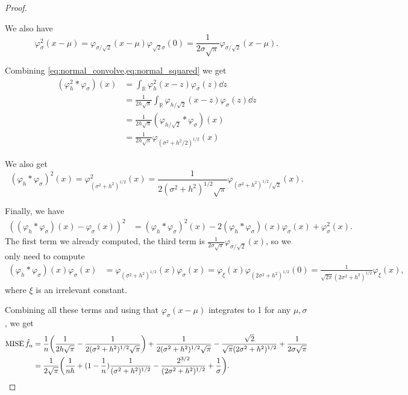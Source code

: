 \documentclass{article}
\theoremstyle{plain}
\theoremstyle{remark}
\renewcommand{\phi}{\varphi}
\newcommand{\Bb}{\mathbb}
\newcommand{\RR}{\Bb R}
\DeclareMathOperator\MISE{MISE}
\begin{document}
\begin{proof}
\begin{enumerate}[(a)]
	We also have
	\begin{equation} \label{eq:normal_squared}
	\phi_\sigma^2(x-\mu) = \phi_{\sigma/\sqrt 2}(x - \mu) \phi_{\sqrt 2 \sigma}(0) = \frac{1}{2 \sigma \sqrt\pi} \phi_{\sigma/\sqrt 2}(x - \mu). 
	\end{equation}

	Combining \cref{eq:normal_convolve,eq:normal_squared} we get 
	\begin{align*}
		(\phi_h^2 * \phi_\sigma)(x) &= \int_\RR \phi_h^2(x-z) \phi_\sigma(z) \dd{z} \\
		&= \frac{1}{2h \sqrt \pi } \int_\RR \phi_{h/\sqrt 2}(x - z) \phi_{\sigma}(z)  \dd{z} \\
		&= \frac{1}{2h\sqrt \pi} (\phi_{h/\sqrt 2} * \phi_\sigma)(x) \\
		&= \frac{1}{2h \sqrt\pi} \phi_{(\sigma^2 + h^2/2)^{1/2}}(x)
	\end{align*}
	\end{enumerate}

	We also get
	\[
	(\phi_h * \phi_\sigma)^2(x) = \phi_{(\sigma^2 + h^2)^{1/2}}^2(x) = \frac{1}{2 (\sigma^2 + h^2)^{1/2} \sqrt\pi} \phi_{(\sigma^2 + h^2)^{1/2}/\sqrt 2}(x).
	\]
	
	Finally, we have
	\begin{align*}
		((\phi_h * \phi_\sigma)(x) - \phi_\sigma(x))^2 &= (\phi_h * \phi_\sigma)^2(x) - 2 (\phi_h * \phi_\sigma)(x) \phi_\sigma(x) + \phi_\sigma^2(x).
	\end{align*}
	The first term we already computed, the third term is $\frac{1}{2\sigma\sqrt\pi} \phi_{\sigma/\sqrt 2}(x)$, so we only need to compute
	\begin{align*}
		(\phi_h * \phi_\sigma)(x) \phi_\sigma(x) &= \phi_{(\sigma^2 + h^2)^{1/2}}(x) \phi_\sigma(x) = \phi_{\xi}(x) \phi_{(2\sigma^2 + h^2)^{1/2}}(0) = \frac{1}{\sqrt{2\pi} (2\sigma^2 + h^2)^{1/2}} \phi_\xi(x),
	\end{align*}
where $\xi$ is an irrelevant constant. 


Combining all these terms and using that $\phi_\sigma(x-\mu)$ integrates to 1 for any $\mu, \sigma$, we get
\begin{align*}
	\MISE \hat f_n &= \frac1n \qty(\frac1{2h\sqrt\pi} - \frac{1}{2(\sigma^2 + h^2)^{1/2}\sqrt\pi}) + \frac{1}{2(\sigma^2 + h^2)^{1/2}\sqrt\pi} - \frac{\sqrt 2}{\sqrt\pi (2\sigma^2 + h^2)^{1/2}} + \frac{1}{2\sigma\sqrt\pi} \\
	&= \frac{1}{2\sqrt\pi} \qty(\frac{1}{nh} + (1 - \frac1n) \frac{1}{(\sigma^2 + h^2)^{1/2}} - \frac{2^{3/2}}{(2\sigma^2 + h^2)^{1/2}} + \frac1\sigma). 
\end{align*}
\end{proof}
\end{document}
